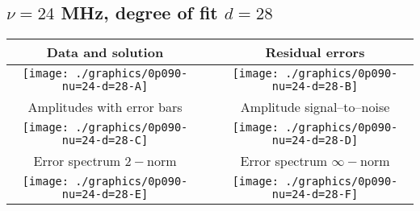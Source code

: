 

% 

\clearpage{}
\break{}

\subsection{$\nu = 24$ MHz, degree of fit $d = 28$}

\begin{table}[h]
    \begin{center}
        \begin{tabular}{ccc}
            Data and solution & \quad & Residual errors \\\hline
            \texttt{[image: ./graphics/0p090-nu=24-d=28-A]} &&
            \texttt{[image: ./graphics/0p090-nu=24-d=28-B]} \\[15pt]
            Amplitudes with error bars && Amplitude signal--to--noise \\\hline
            \texttt{[image: ./graphics/0p090-nu=24-d=28-C]} &&
            \texttt{[image: ./graphics/0p090-nu=24-d=28-D]} \\[15pt]
            Error spectrum $2-$norm && Error spectrum $\infty-$norm \\\hline
            \texttt{[image: ./graphics/0p090-nu=24-d=28-E]} &&
            \texttt{[image: ./graphics/0p090-nu=24-d=28-F]} \\[15pt]
        \end{tabular}
    \end{center}
\label{fig:elev=90, nu=24}
\end{table}



\endinput

